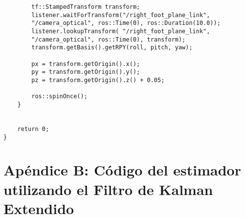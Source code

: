 \begin{lstlisting}
        tf::StampedTransform transform;
        listener.waitForTransform("/right_foot_plane_link", 
        "/camera_optical", ros::Time(0), ros::Duration(10.0));
        listener.lookupTransform( "/right_foot_plane_link", 
        "/camera_optical", ros::Time(0), transform);
        transform.getBasis().getRPY(roll, pitch, yaw);

        px = transform.getOrigin().x();
        py = transform.getOrigin().y();
        pz = transform.getOrigin().z() + 0.05;

        ros::spinOnce();
    }

    
    return 0;
}

\end{lstlisting}


\section{Apéndice B: Código del estimador utilizando el Filtro de Kalman Extendido}

